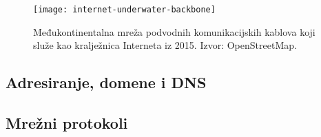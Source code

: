 \begin{figure}[h]
    \texttt{[image: internet-underwater-backbone]}
    \caption{Međukontinentalna mreža podvodnih komunikacijskih kablova koji služe kao kralježnica Interneta iz 2015. Izvor: OpenStreetMap. }\label{fig:figure6}
\end{figure}





\subsection{Adresiranje, domene i DNS}


\subsection{Mrežni protokoli}

